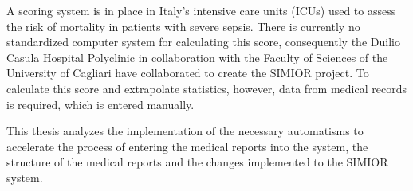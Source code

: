 \vspace{4cm}
A scoring system is in place in Italy's intensive care units (ICUs) used to assess the risk of mortality in patients with severe sepsis. There is currently no standardized computer system for calculating this score, consequently the Duilio Casula Hospital Polyclinic in collaboration with the Faculty of Sciences of the University of Cagliari have collaborated to create the SIMIOR project. To calculate this score and extrapolate statistics, however, data from medical records is required, which is entered manually.
\par\bigskip
This thesis analyzes the implementation of the necessary automatisms to accelerate the process of entering the medical reports into the system, the structure of the medical reports and the changes implemented to the SIMIOR system.